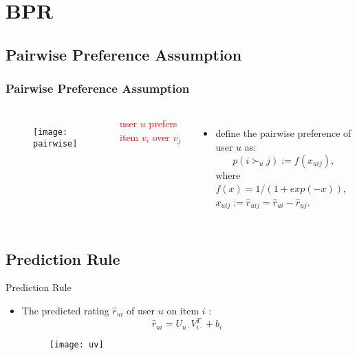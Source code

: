 \section{BPR}

	
\subsection*{Pairwise Preference Assumption}
\begin{frame}
	\frametitle{Pairwise Preference Assumption}
	\begin{columns}
			\begin{figure}
				\vspace{-7em}
				\texttt{[image: pairwise]}
			\end{figure}
			\vspace{-6em}
			\hspace{4em} \textcolor{red}{user $u$ prefers item $v_i$ over  $v_j$}
			
		\begin{itemize}
			\item define the pairwise preference of user $u$ as:
			\begin{equation}
			p \left( i \succ_u j \right) := f \left( x_{uij} \right),
			\end{equation}
			where $f \left(x\right) = 1/\left(1+exp\left(-x\right)\right)$, $x_{uij} := \hat{r}_{uij} = \hat{r}_{ui} -\hat{r}_{uj}$.
		\end{itemize}
		
	\end{columns}
\end{frame}

\subsection*{Prediction Rule}
\begin{frame}{Prediction Rule}
	\begin{itemize}
		\vspace{2em}
		\item The predicted rating $\hat{r}_{ui}$ of user $u$ on item $i$ :
		\begin{equation}
		\hat{r}_{ui} = U_{u\cdot}V_{i\cdot}^T + b_i
		\end{equation}
		\begin{centering}
			\begin{figure}
				\vspace{-7em}
				\texttt{[image: uv]}
			\end{figure}
		\end{centering}
	\end{itemize}
	
\end{frame}



